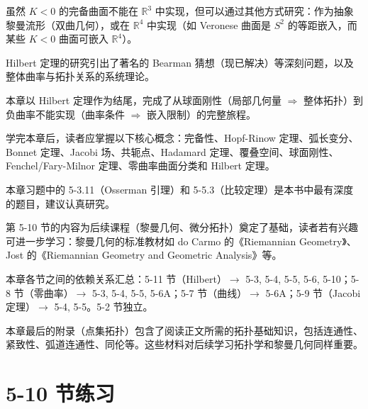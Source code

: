 \begin{Remark}
\begin{Remark}
虽然 $K<0$ 的完备曲面不能在 $\mathbb{R}^3$ 中实现，但可以通过其他方式研究：作为抽象黎曼流形（双曲几何），或在 $\mathbb{R}^4$ 中实现（如 Veronese 曲面是 $S^2$ 的等距嵌入，而某些 $K<0$ 曲面可嵌入 $\mathbb{R}^4$）。
\end{Remark}

\begin{Remark}
Hilbert 定理的研究引出了著名的 Bearman 猜想（现已解决）等深刻问题，以及整体曲率与拓扑关系的系统理论。
\end{Remark}

\begin{Remark}
本章以 Hilbert 定理作为结尾，完成了从球面刚性（局部几何量 $\Rightarrow$ 整体拓扑）到负曲率不能实现（曲率条件 $\Rightarrow$ 嵌入限制）的完整旅程。
\end{Remark}

\begin{Remark}
学完本章后，读者应掌握以下核心概念：完备性、Hopf-Rinow 定理、弧长变分、Bonnet 定理、Jacobi 场、共轭点、Hadamard 定理、覆叠空间、球面刚性、Fenchel/Fary-Milnor 定理、零曲率曲面分类和 Hilbert 定理。
\end{Remark}

\begin{Remark}
本章习题中的 5-3.11（Osserman 引理）和 5-5.3（比较定理）是本书中最有深度的题目，建议认真研究。
\end{Remark}

\begin{Remark}
第 5-10 节的内容为后续课程（黎曼几何、微分拓扑）奠定了基础，读者若有兴趣可进一步学习：黎曼几何的标准教材如 do Carmo 的《Riemannian Geometry》、Jost 的《Riemannian Geometry and Geometric Analysis》等。
\end{Remark}

\begin{Remark}
本章各节之间的依赖关系汇总：5-11 节（Hilbert）$\to$ 5-3, 5-4, 5-5, 5-6, 5-10；5-8 节（零曲率）$\to$ 5-3, 5-4, 5-5, 5-6A；5-7 节（曲线）$\to$ 5-6A；5-9 节（Jacobi 定理）$\to$ 5-4, 5-5。5-2 节独立。
\end{Remark}

\begin{Remark}
本章最后的附录（点集拓扑）包含了阅读正文所需的拓扑基础知识，包括连通性、紧致性、弧道连通性、同伦等。这些材料对后续学习拓扑学和黎曼几何同样重要。
\end{Remark}

\section*{5-10 节练习}


\end{Remark}
